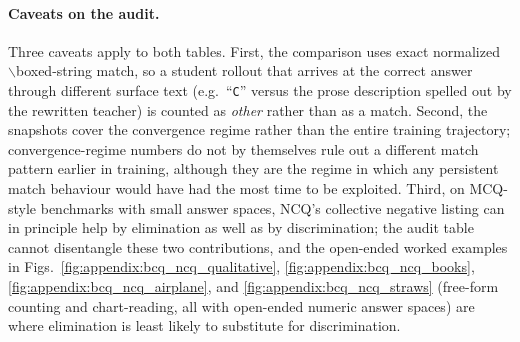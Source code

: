 \documentclass{llmxive}
\begin{document}
\paragraph{Caveats on the audit.} Three caveats apply to both tables. First, the comparison uses exact normalized $\backslash$boxed-string match, so a student rollout that arrives at the correct answer through different surface text (e.g.\ ``\texttt{C}'' versus the prose description spelled out by the rewritten teacher) is counted as \emph{other} rather than as a match. Second, the snapshots cover the convergence regime rather than the entire training trajectory; convergence-regime numbers do not by themselves rule out a different match pattern earlier in training, although they are the regime in which any persistent match behaviour would have had the most time to be exploited. Third, on MCQ-style benchmarks with small answer spaces, NCQ's collective negative listing can in principle help by elimination as well as by discrimination; the audit table cannot disentangle these two contributions, and the open-ended worked examples in Figs.~\ref{fig:appendix:bcq_ncq_qualitative}, \ref{fig:appendix:bcq_ncq_books}, \ref{fig:appendix:bcq_ncq_airplane}, and \ref{fig:appendix:bcq_ncq_straws} (free-form counting and chart-reading, all with open-ended numeric answer spaces) are where elimination is least likely to substitute for discrimination.
\end{document}
